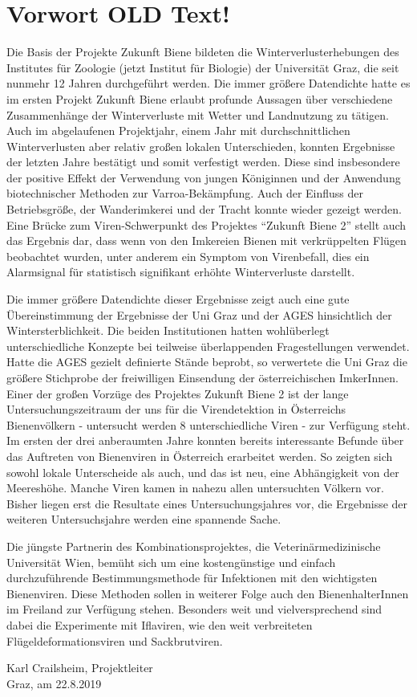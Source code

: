 {}
\section*{Vorwort OLD Text!}

Die Basis der Projekte Zukunft Biene bildeten die Winterverlusterhebungen des Institutes für Zoologie (jetzt Institut für Biologie) der Universität Graz, die seit nunmehr 12 Jahren durchgeführt werden. Die immer größere Datendichte hatte es im ersten Projekt Zukunft Biene erlaubt profunde Aussagen über verschiedene Zusammenhänge der Winterverluste mit Wetter und Landnutzung zu tätigen. Auch im abgelaufenen Projektjahr, einem Jahr mit durchschnittlichen Winterverlusten aber relativ großen lokalen Unterschieden, konnten Ergebnisse der letzten Jahre bestätigt und somit verfestigt werden. Diese sind insbesondere der positive Effekt der Verwendung von jungen Königinnen und der Anwendung biotechnischer Methoden zur Varroa-Bekämpfung. Auch der Einfluss der Betriebsgröße, der Wanderimkerei und der Tracht konnte wieder gezeigt werden. Eine Brücke zum Viren-Schwerpunkt des Projektes \enquote{Zukunft Biene 2} stellt auch das Ergebnis dar, dass wenn von den Imkereien Bienen mit verkrüppelten Flügen beobachtet wurden, unter anderem ein Symptom von Virenbefall, dies ein Alarmsignal für statistisch signifikant erhöhte Winterverluste
darstellt.

Die immer größere Datendichte dieser Ergebnisse zeigt auch eine gute Übereinstimmung der Ergebnisse der Uni Graz und der AGES hinsichtlich der Wintersterblichkeit. Die beiden Institutionen hatten wohlüberlegt unterschiedliche Konzepte bei teilweise überlappenden Fragestellungen verwendet. Hatte die AGES gezielt definierte Stände beprobt, so verwertete die
Uni Graz die größere Stichprobe der freiwilligen Einsendung der österreichischen ImkerInnen. Einer der großen Vorzüge des Projektes Zukunft Biene 2 ist der lange Untersuchungszeitraum der uns für die Virendetektion in Österreichs Bienenvölkern - untersucht werden 8 unterschiedliche Viren - zur Verfügung steht. Im ersten der drei anberaumten Jahre konnten bereits interessante Befunde über das Auftreten von Bienenviren in Österreich erarbeitet werden. So zeigten sich
sowohl lokale Unterscheide als auch, und das ist neu, eine Abhängigkeit von der Meereshöhe. Manche Viren kamen in nahezu allen untersuchten Völkern vor. Bisher liegen erst die Resultate eines Untersuchungsjahres vor, die Ergebnisse der weiteren Untersuchsjahre werden eine spannende Sache.

Die jüngste Partnerin des Kombinationsprojektes, die Veterinärmedizinische Universität Wien, bemüht sich um eine kostengünstige und einfach durchzuführende Bestimmungsmethode für Infektionen mit den wichtigsten Bienenviren. Diese Methoden sollen in weiterer Folge auch den BienenhalterInnen im Freiland zur Verfügung stehen. Besonders weit und vielversprechend sind dabei die Experimente mit Iflaviren, wie den weit verbreiteten Flügeldeformationsviren und
Sackbrutviren.

\begin{flushright}
    Karl Crailsheim, Projektleiter \\
    Graz, am 22.8.2019
\end{flushright}